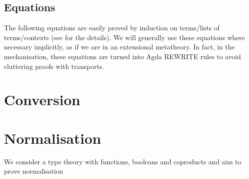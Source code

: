 \documentclass[
    a4paper, %
    fontsize=9.5pt, %
    twoside=false, %
	numbers=noenddot, %
	fontmethod=tex, %
]{kaobook}
\newcommand{\Conid}[1]{\mathit{#1}}
\newcommand{\Varid}[1]{\mathit{#1}}
\def\resethooks{%
  \global\let\SaveRestoreHook\empty
  \global\let\ColumnHook\empty}
\newlength{\blanklineskip}
\renewcommand\Varid[1]{\mathord{\textsf{#1}}}
\let\Conid\Varid
\begin{document}
\resethooks

\subsection{Equations}

The following equations are easily proved by induction on terms/lists of 
terms/contexts (see  for the details). 
We will generally use these equations where necessary implicitly, as if we are
in an extensional metatheory. In fact, in the mechanisation, these equations
are turned into Agda REWRITE rules to avoid cluttering proofs with transports.

\section{Conversion}

\section{Normalisation}

We consider a type theory with functions, booleans
and coproducts and aim to prove normalisation
\end{document}
